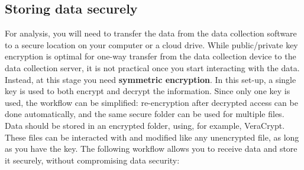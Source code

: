 \subsection{Storing data securely}
For analysis, you will need to transfer the data from the data collection software to
a secure location on your computer or a cloud drive.
While public/private key encryption is optimal for one-way transfer
from the data collection device to the data collection server,
it is not practical once you start interacting with the data.
Instead, at this stage you need \textbf{symmetric encryption}.
In this set-up, a single key is used to both encrypt and decrypt the information.
Since only one key is used, the workflow can be simplified:
re-encryption after decrypted access can be done automatically,
and the same secure folder can be used for multiple files.
Data should be stored in an encrypted folder,
using, for example, VeraCrypt.
These files can be interacted with and modified like any unencrypted file,
 as long as you have the key.
The following workflow allows you to receive data and store it securely,
without compromising data security:

